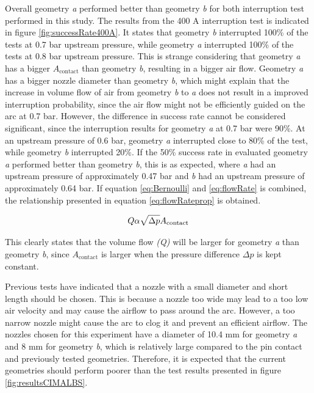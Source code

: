 \documentclass[10pt,a4paper,twoside]{article}
\begin{document}
Overall geometry \textit{a} performed better than geometry \textit{b} for both interruption test performed in this study. The results from the 400 A interruption test is indicated in figure \ref{fig:successRate400A}. It states that geometry \textit{b} interrupted 100\% of the tests at 0.7 bar upstream pressure, while geometry \textit{a} interrupted 100\% of the tests at 0.8 bar upstream pressure. This is strange considering that geometry \textit{a} has a bigger $A_\mathrm{{contact}}$ than geometry \textit{b}, resulting in a bigger air flow. Geometry \textit{a} has a bigger nozzle diameter than geometry \textit{b}, which might explain that the increase in volume flow of air from geometry \textit{b} to \textit{a} does not result in a improved interruption probability, since the air flow might not be efficiently guided on the arc at 0.7 bar. However, the difference in success rate cannot be considered significant, since the interruption results for geometry \textit{a} at 0.7 bar were 90\%. At an upstream pressure of 0.6 bar, geometry \textit{a} interrupted close to 80\% of the test, while geometry \textit{b} interrupted 20\%. If the 50\% success rate in evaluated geometry \textit{a} performed better than geometry \textit{b}, this is as expected, where \textit{a} had an upstream pressure of approximately 0.47 bar and \textit{b} had an upstream pressure of approximately 0.64 bar. If equation \eqref{eq:Bernoulli} and \eqref{eq:flowRate} is combined, the relationship presented in equation \eqref{eq:flowRateprop} is obtained.

\begin{equation} \label{eq:flowRateprop}
Q \\ \alpha \\ \sqrt{\Delta p} A_\mathrm{{contact}}
\end{equation}

This clearly states that the volume flow \textit{(Q)} will be larger for geometry \textit{a} than geometry \textit{b}, since $A_\mathrm{{contact}}$ is larger when the pressure difference $\Delta p$ is kept constant.

Previous tests have indicated that a nozzle with a small diameter and short length should be chosen. This is because a nozzle too wide may lead to a too low air velocity and may cause the airflow to pass around the arc. However, a too narrow nozzle might cause the arc to clog it and prevent an efficient airflow. The nozzles chosen for this experiment have a diameter of 10.4 mm for geometry \textit{a} and 8 mm for geometry \textit{b}, which is relatively large compared to the pin contact and previously tested geometries. Therefore, it is expected that the current geometries should perform poorer than the test results presented in figure \ref{fig:resultsCIMALBS}.
\end{document}

